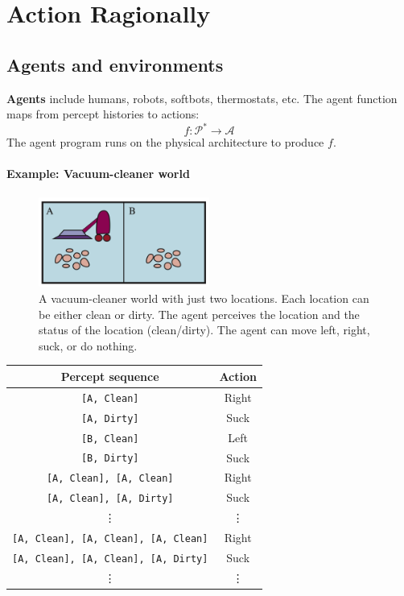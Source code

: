 \chapter{Action Ragionally}
\section{Agents and environments}
\textbf{Agents} include humans, robots, softbots, thermostats, etc.
The agent function maps from percept histories to actions: 
\[f: \mathcal{P}^* \rightarrow \mathcal{A}\]
The agent program runs on the physical architecture to produce $f$.
\subsubsection{Example: Vacuum-cleaner world}
\begin{figure}[H]
    \centering
    \includegraphics[width=0.5\textwidth]{img/vacuum-cleaner.png}
    \caption{A vacuum-cleaner world with just two locations. Each location can be either clean or dirty. 
    The agent perceives the location and the status of the location (clean/dirty). 
    The agent can move left, right, suck, or do nothing.}
    \label{fig:vacuum_cleaner_world}
\end{figure}
\begin{tabular}[H]{|cc|}
    \hline
    \textbf{Percept sequence} & \textbf{Action} \\
    \hline
    \verb|[A, Clean]| & Right \\
    \verb|[A, Dirty]| & Suck \\
    \verb|[B, Clean]| & Left \\
    \verb|[B, Dirty]| & Suck \\
    \verb|[A, Clean], [A, Clean]| & Right \\
    \verb|[A, Clean], [A, Dirty]| & Suck \\
    \vdots & \vdots \\
    \verb|[A, Clean], [A, Clean], [A, Clean]| & Right \\
    \verb|[A, Clean], [A, Clean], [A, Dirty]| & Suck \\
    \vdots & \vdots \\
    \hline
\end{tabular} 


